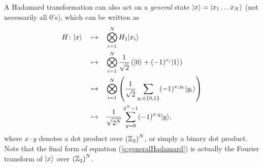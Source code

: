A Hadamard transformation can also act on a {\sl general} state 
${|{x}\rangle}={|{x_1\ldots x_N}\rangle}$
(not necessarily all 0's), which can be written as
\begin{equation}
\begin{split}
H\colon{|{x}\rangle}\quad\mapsto\quad&
\bigotimes_{i=1}^N 
H_1{|{x_i}\rangle}\\
\quad\mapsto\quad&
\bigotimes_{i=1}^N 
\frac{1}{\sqrt{2}} \left( {|{0}\rangle} + (-1)^{x_i}{|{1}\rangle} \right)\\
\quad\mapsto\quad&
\bigotimes_{i=1}^N 
\left(\frac{1}{\sqrt{2}} \sum_{y_i\in\lbrace 0,1\rbrace} 
(-1)^{x_iy_i}{|{y_i}\rangle}\right)\\
\quad\mapsto\quad&
\frac{1}{\sqrt{2^N}} \sum_{y=0}^{2^N-1} (-1)^{x\cdot y}{|{y}\rangle},
\end{split}
\label{e:generalHadamard}
\end{equation}
where $x\cdot y$ denotes a dot product over $\left({\mathbb{Z}}_2\right)^N$, or
simply a binary dot product.  Note that the final form of equation
(\ref{e:generalHadamard}) is actually the Fourier transform of ${|{x}\rangle}$
over $\left({\mathbb{Z}}_2\right)^N$.



%

%

%

